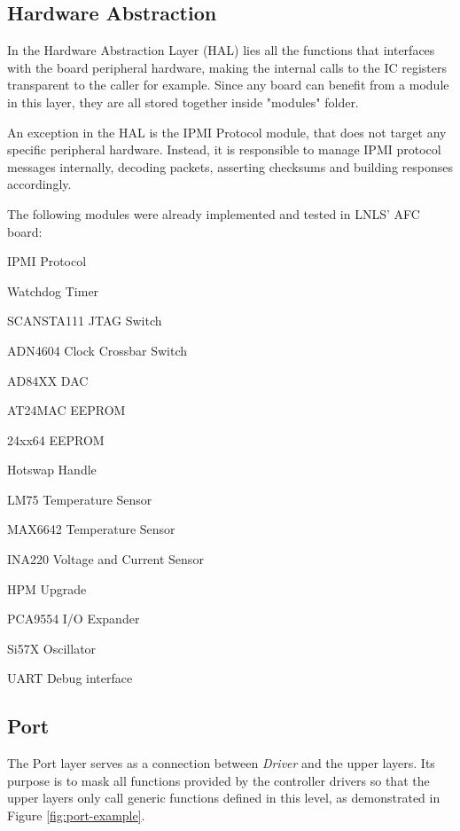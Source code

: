 \documentclass[a4paper,
              ]{jacow}
\begin{document}
\subsection{Hardware Abstraction}
In the Hardware Abstraction Layer (HAL) lies all the functions that interfaces with the board peripheral hardware, making the internal calls to the IC registers transparent to the caller for example. Since any board can benefit from a module in this layer, they are all stored together inside "modules" folder.

An exception in the HAL is the IPMI Protocol module, that does not target any specific peripheral hardware. Instead, it is responsible to manage IPMI protocol messages internally, decoding packets, asserting checksums and building responses accordingly.

The following modules were already implemented and tested in LNLS' AFC board:
\begin{Itemize}

\item IPMI Protocol
\item Watchdog Timer
\item SCANSTA111 JTAG Switch
\item ADN4604 Clock Crossbar Switch
\item AD84XX DAC
\item AT24MAC EEPROM
\item 24xx64 EEPROM
\item Hotswap Handle
\item LM75 Temperature Sensor
\item MAX6642 Temperature Sensor
\item INA220 Voltage and Current Sensor
\item HPM Upgrade
\item PCA9554 I/O Expander
\item Si57X Oscillator
\item UART Debug interface

\end{Itemize}

\subsection{Port}
The Port layer serves as a connection between \emph{Driver} and the upper layers.
Its purpose is to mask all functions provided by the controller drivers so that the upper layers only call generic functions defined in this level, as demonstrated in Figure \ref{fig:port-example}.
\end{document}
